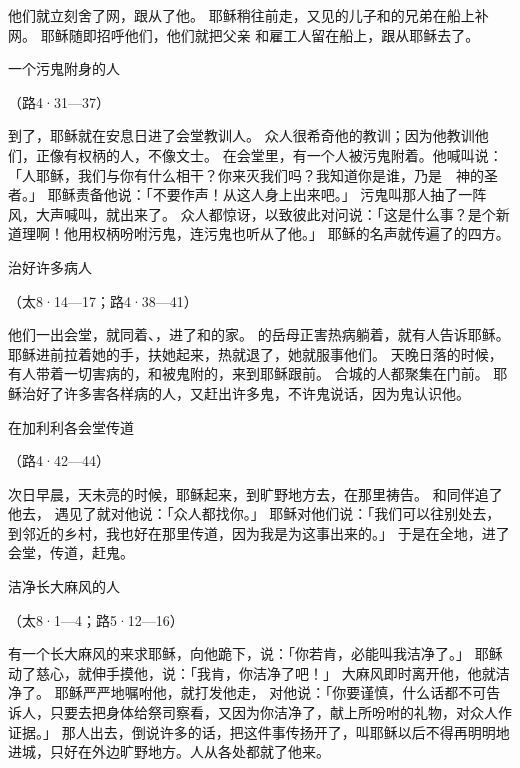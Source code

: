 {他们就立刻舍了网，跟从了他。
耶稣稍往前走，又见{}的儿子{}和{}的兄弟{}在船上补网。
耶稣随即招呼他们，他们就把父亲
{}和雇工人留在船上，跟从耶稣去了。
\par }{\SH 一个污鬼附身的人
\par }{\R （路4·31—37）
\par }{\PP {}到了{}，耶稣就在安息日进了会堂教训人。
众人很希奇他的教训；因为他教训他们，正像有权柄的人，不像文士。
在会堂里，有一个人被污鬼附着。他喊叫说：
「{}人耶稣，我们与你有什么相干？你来灭我们吗？我知道你是谁，乃是　神的圣者。」
耶稣责备他说：「不要作声！从这人身上出来吧。」
污鬼叫那人抽了一阵风，大声喊叫，就出来了。
众人都惊讶，以致彼此对问说：「这是什么事？是个新道理啊！他用权柄吩咐污鬼，连污鬼也听从了他。」
耶稣的名声就传遍了{}的四方。
\par }{\SH 治好许多病人
\par }{\R （太8·14—17；路4·38—41）
\par }{\PP {}他们一出会堂，就同着{}、{}，进了{}和{}的家。
的岳母正害热病躺着，就有人告诉耶稣。
耶稣进前拉着她的手，扶她起来，热就退了，她就服事他们。
天晚日落的时候，有人带着一切害病的，和被鬼附的，来到耶稣跟前。
合城的人都聚集在门前。
耶稣治好了许多害各样病的人，又赶出许多鬼，不许鬼说话，因为鬼认识他。
\par }{\SH 在加利利各会堂传道
\par }{\R （路4·42—44）
\par }{\PP {}次日早晨，天未亮的时候，耶稣起来，到旷野地方去，在那里祷告。
和同伴追了他去，
遇见了就对他说：「众人都找你。」
耶稣对他们说：「我们可以往别处去，到邻近的乡村，我也好在那里传道，因为我是为这事出来的。」
于是在{}全地，进了会堂，传道，赶鬼。
\par }{\SH 洁净长大麻风的人
\par }{\R （太8·1—4；路5·12—16）
\par }{\PP {}有一个长大麻风的来求耶稣，向他跪下，说：「你若肯，必能叫我洁净了。」
耶稣动了慈心，就伸手摸他，说：「我肯，你洁净了吧！」
大麻风即时离开他，他就洁净了。
耶稣严严地嘱咐他，就打发他走，
对他说：「你要谨慎，什么话都不可告诉人，只要去把身体给祭司察看，又因为你洁净了，献上{}所吩咐的礼物，对众人作证据。」
那人出去，倒说许多的话，把这件事传扬开了，叫耶稣以后不得再明明地进城，只好在外边旷野地方。人从各处都就了他来。

}
